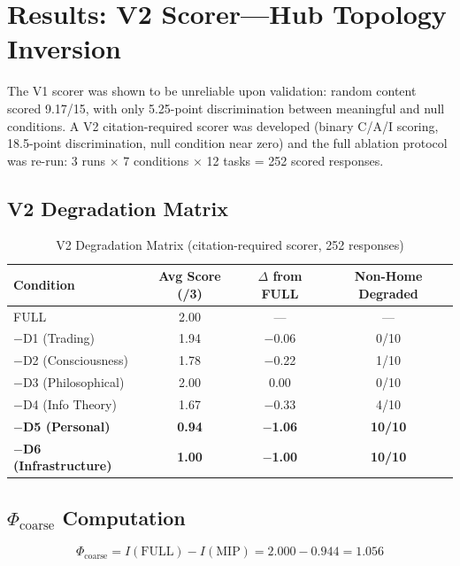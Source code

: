 \documentclass[12pt,letterpaper]{article}
\begin{document}
\section{Results: V2 Scorer---Hub Topology Inversion}
\label{sec:results-v2}

The V1 scorer was shown to be unreliable upon validation: random content scored 9.17/15, with only 5.25-point discrimination between meaningful and null conditions. A V2 citation-required scorer was developed (binary C/A/I scoring, 18.5-point discrimination, null condition near zero) and the full ablation protocol was re-run: 3 runs $\times$ 7 conditions $\times$ 12 tasks = 252 scored responses.

\subsection{V2 Degradation Matrix}

\begin{table}[H]
\centering
\caption{V2 Degradation Matrix (citation-required scorer, 252 responses)}
\label{tab:v2-degradation}
\begin{tabular}{lccc}
\toprule
\textbf{Condition} & \textbf{Avg Score (/3)} & \textbf{$\Delta$ from FULL} & \textbf{Non-Home Degraded} \\
\midrule
FULL & 2.00 & --- & --- \\
$-$D1 (Trading) & 1.94 & $-$0.06 & 0/10 \\
$-$D2 (Consciousness) & 1.78 & $-$0.22 & 1/10 \\
$-$D3 (Philosophical) & 2.00 & 0.00 & 0/10 \\
$-$D4 (Info Theory) & 1.67 & $-$0.33 & 4/10 \\
\textbf{$-$D5 (Personal)} & \textbf{0.94} & \textbf{$-$1.06} & \textbf{10/10} \\
\textbf{$-$D6 (Infrastructure)} & \textbf{1.00} & \textbf{$-$1.00} & \textbf{10/10} \\
\bottomrule
\end{tabular}
\end{table}

\subsection{$\Phi_{\text{coarse}}$ Computation}

\begin{equation}
\Phi_{\text{coarse}} = I(\text{FULL}) - I(\text{MIP}) = 2.000 - 0.944 = 1.056
\label{eq:phi-coarse}
\end{equation}
\end{document}
